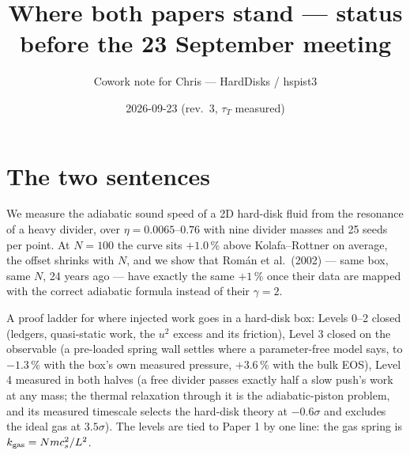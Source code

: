 \documentclass[11pt,a4paper]{article}
\title{Where both papers stand --- status before the 23 September meeting}
\author{Cowork note for Chris --- HardDisks / hspist3}
\date{2026-09-23 (rev.\ 3, $\tau_T$ measured)}
\begin{document}
\maketitle

\section*{The two sentences}
\begin{say}
We measure the adiabatic sound speed of a 2D hard-disk fluid from the resonance of a heavy divider, over $\eta = 0.0065$--$0.76$ with nine divider masses and 25 seeds per point. At $N = 100$ the curve sits $+1.0\,\%$ above Kolafa--Rottner on average, the offset shrinks with $N$, and we show that Rom\'an et al.\ (2002) --- same box, same $N$, 24 years ago --- have exactly the same $+1\,\%$ once their data are mapped with the correct adiabatic formula instead of their $\gamma = 2$.
\end{say}
\begin{say}
A proof ladder for where injected work goes in a hard-disk box: Levels 0--2 closed (ledgers, quasi-static work, the $u^2$ excess and its friction), Level 3 closed on the observable (a pre-loaded spring wall settles where a parameter-free model says, to $-1.3\,\%$ with the box's own measured pressure, $+3.6\,\%$ with the bulk EOS), Level 4 measured in both halves (a free divider passes exactly half a slow push's work at any mass; the thermal relaxation through it is the adiabatic-piston problem, and its measured timescale selects the hard-disk theory at $-0.6\sigma$ and excludes the ideal gas at $3.5\sigma$). The levels are tied to Paper 1 by one line: the gas spring is $k_{\rm gas} = N m c_s^2/L^2$.
\end{say}
\end{document}
